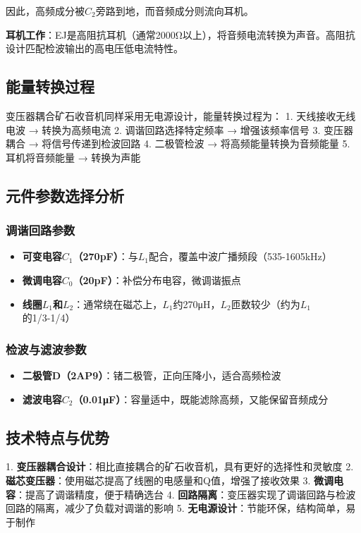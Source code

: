 \documentclass[12pt,UTF8]{ctexbook}
\begin{document}
因此，高频成分被$C_2$旁路到地，而音频成分则流向耳机。

\textbf{耳机工作}：EJ是高阻抗耳机（通常2000Ω以上），将音频电流转换为声音。高阻抗设计匹配检波输出的高电压低电流特性。

\subsection{能量转换过程}

变压器耦合矿石收音机同样采用无电源设计，能量转换过程为：
1. 天线接收无线电波 → 转换为高频电流
2. 调谐回路选择特定频率 → 增强该频率信号
3. 变压器耦合 → 将信号传递到检波回路
4. 二极管检波 → 将高频能量转换为音频能量
5. 耳机将音频能量 → 转换为声能

\subsection{元件参数选择分析}

\subsubsection{调谐回路参数}\begin{itemize}
  \item \textbf{可变电容$C_1$（270pF）}：与$L_1$配合，覆盖中波广播频段（535-1605kHz）
  \item \textbf{微调电容$C_0$（20pF）}：补偿分布电容，微调谐振点
  \item \textbf{线圈$L_1$和$L_2$}：通常绕在磁芯上，$L_1$约270μH，$L_2$匝数较少（约为$L_1$的1/3-1/4）\end{itemize}

\subsubsection{检波与滤波参数}\begin{itemize}
  \item \textbf{二极管D（2AP9）}：锗二极管，正向压降小，适合高频检波
  \item \textbf{滤波电容$C_2$（0.01μF）}：容量适中，既能滤除高频，又能保留音频成分\end{itemize}

\subsection{技术特点与优势}

1. \textbf{变压器耦合设计}：相比直接耦合的矿石收音机，具有更好的选择性和灵敏度
2. \textbf{磁芯变压器}：使用磁芯提高了线圈的电感量和Q值，增强了接收效果
3. \textbf{微调电容}：提高了调谐精度，便于精确选台
4. \textbf{回路隔离}：变压器实现了调谐回路与检波回路的隔离，减少了负载对调谐的影响
5. \textbf{无电源设计}：节能环保，结构简单，易于制作
\end{document}
